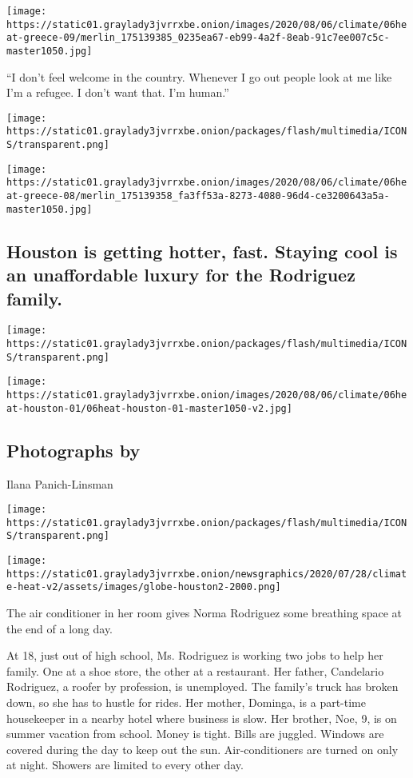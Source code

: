 \texttt{[image: https://static01.graylady3jvrrxbe.onion/images/2020/08/06/climate/06heat-greece-09/merlin\_175139385\_0235ea67-eb99-4a2f-8eab-91c7ee007c5c-master1050.jpg]}

``I don't feel welcome in the country. Whenever I go out people look at
me like I'm a refugee. I don't want that. I'm human.''

\texttt{[image: https://static01.graylady3jvrrxbe.onion/packages/flash/multimedia/ICONS/transparent.png]}

\texttt{[image: https://static01.graylady3jvrrxbe.onion/images/2020/08/06/climate/06heat-greece-08/merlin\_175139358\_fa3ff53a-8273-4080-96d4-ce3200643a5a-master1050.jpg]}

\hypertarget{houston-is-getting-hotter-fast-staying-cool-is-an-unaffordable-luxury-for-the-rodriguez-family}{%
\subsection{Houston is getting hotter, fast. Staying cool is an
unaffordable luxury for the Rodriguez
family.}\label{houston-is-getting-hotter-fast-staying-cool-is-an-unaffordable-luxury-for-the-rodriguez-family}}

\texttt{[image: https://static01.graylady3jvrrxbe.onion/packages/flash/multimedia/ICONS/transparent.png]}

\texttt{[image: https://static01.graylady3jvrrxbe.onion/images/2020/08/06/climate/06heat-houston-01/06heat-houston-01-master1050-v2.jpg]}

\hypertarget{photographs-by-1}{%
\subsection{Photographs by}\label{photographs-by-1}}

Ilana Panich-Linsman

\texttt{[image: https://static01.graylady3jvrrxbe.onion/packages/flash/multimedia/ICONS/transparent.png]}

\texttt{[image: https://static01.graylady3jvrrxbe.onion/newsgraphics/2020/07/28/climate-heat-v2/assets/images/globe-houston2-2000.png]}

The air conditioner in her room gives Norma Rodriguez some breathing
space at the end of a long day.

At 18, just out of high school, Ms. Rodriguez is working two jobs to
help her family. One at a shoe store, the other at a restaurant. Her
father, Candelario Rodriguez, a roofer by profession, is unemployed. The
family's truck has broken down, so she has to hustle for rides. Her
mother, Dominga, is a part-time housekeeper in a nearby hotel where
business is slow. Her brother, Noe, 9, is on summer vacation from
school. Money is tight. Bills are juggled. Windows are covered during
the day to keep out the sun. Air-conditioners are turned on only at
night. Showers are limited to every other day.

